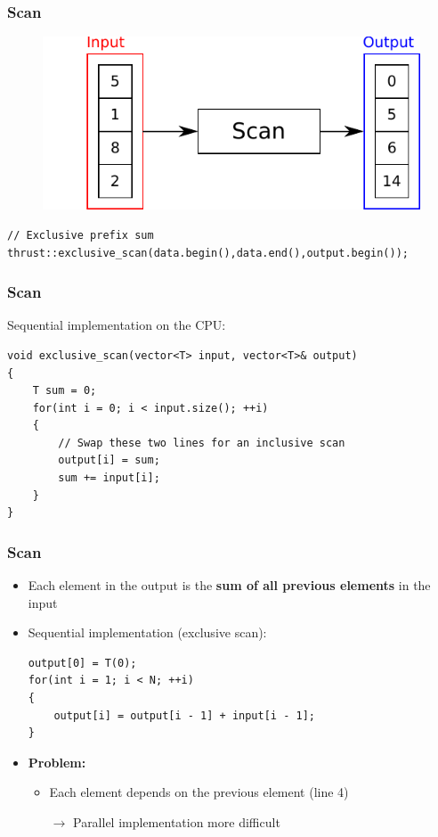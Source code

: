 \documentclass[aspectratio=169]{beamer}
\begin{document}
\begin{frame}[fragile]
\frametitle{Scan}
\begin{figure}
	\centering
	\includegraphics[height=0.6\textheight]{o_scan}
\end{figure}
\begin{lstlisting}
// Exclusive prefix sum
thrust::exclusive_scan(data.begin(),data.end(),output.begin());
\end{lstlisting}
\end{frame}


\begin{frame}[fragile]
	\frametitle{Scan}
	Sequential implementation on the CPU:
\begin{lstlisting}
void exclusive_scan(vector<T> input, vector<T>& output)
{
	T sum = 0;
	for(int i = 0; i < input.size(); ++i)
	{
		// Swap these two lines for an inclusive scan
		output[i] = sum;
		sum += input[i];
	}
}
\end{lstlisting}
\end{frame}

\begin{frame}[fragile]
	\frametitle{Scan}
	\begin{itemize}
		\item Each element in the output is the \textbf{sum of all previous elements} in the input
		\item<2-> Sequential implementation (exclusive scan):
\begin{lstlisting}
output[0] = T(0);
for(int i = 1; i < N; ++i)
{
	output[i] = output[i - 1] + input[i - 1];
}
\end{lstlisting}
\item<3-> \textbf{Problem:}
\begin{itemize}
	\item Each element depends on the previous element (line 4)
	\item[$\rightarrow$] Parallel implementation more difficult 
\end{itemize}

\end{itemize}
\end{frame}
\end{document}
